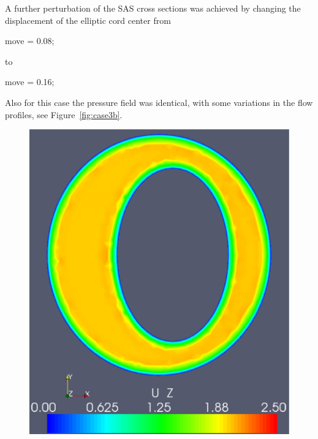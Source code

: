 A further perturbation of the SAS cross sections was achieved by
changing the displacement of the elliptic cord center from
\begin{anycode}
move = 0.08;
\end{anycode}
to
\begin{anycode}
move = 0.16;
\end{anycode}
Also for this case the pressure field was identical, with some
variations in the flow profiles, see Figure~\ref{fig:case3b}.

\begin{figure}
          {\includegraphics[width=\threefigsfull]{chapters/hentschel/pdf/pulse_f1_08_elliptic_sysmax_nmb7.pdf}
}
\end{figure}
